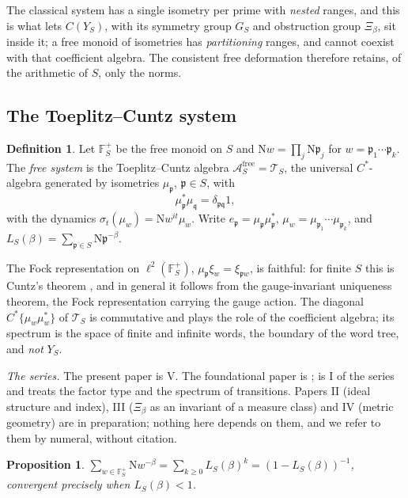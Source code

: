 \documentclass[11pt]{amsart}
\numberwithin{equation}{section}
\newtheorem{proposition}[theorem]{Proposition}
\theoremstyle{definition}
\newtheorem{definition}[theorem]{Definition}
\theoremstyle{remark}
\newcommand{\F}{\mathbb{F}}
\newcommand{\cA}{\mathcal{A}}
\newcommand{\cT}{\mathcal{T}}
\newcommand{\pp}{\mathfrak{p}}
\newcommand{\qq}{\mathfrak{q}}
\newcommand{\Ns}{\mathrm{N}}
\begin{document}
The classical system has a single isometry per prime with \emph{nested} ranges, and this
is what lets $C(Y_S)$, with its symmetry group $G_S$ and obstruction group $\Xi_\beta$, sit
inside it; a free monoid of isometries has \emph{partitioning} ranges, and cannot coexist
with that coefficient algebra. The consistent free deformation therefore retains, of the
arithmetic of $S$, only the norms.

\subsection{The Toeplitz--Cuntz system}

\begin{definition}\label{def:free}
Let $\F_S^+$ be the free monoid on $S$ and $\Ns w=\prod_j\Ns\pp_j$ for
$w=\pp_1\cdots\pp_k$. The \emph{free system} is the Toeplitz--Cuntz algebra
$\cA^{\mathrm{free}}_S=\cT_S$, the universal $C^*$-algebra generated by isometries $\mu_\pp$,
$\pp\in S$, with
\begin{equation}\label{eq:rel}
\mu_\pp^*\mu_\qq=\delta_{\pp\qq}1 ,
\end{equation}
with the dynamics $\sigma_t(\mu_w)=\Ns w^{it}\mu_w$. Write $e_\pp=\mu_\pp\mu_\pp^*$,
$\mu_w=\mu_{\pp_1}\cdots\mu_{\pp_k}$, and $L_S(\beta)=\sum_{\pp\in S}\Ns\pp^{-\beta}$.
\end{definition}

The Fock representation on $\ell^2(\F_S^+)$, $\mu_\pp\xi_w=\xi_{\pp w}$, is faithful: for
finite $S$ this is Cuntz's theorem \cite{Cuntz77}, and in general it follows from the
gauge-invariant uniqueness theorem, the Fock representation carrying the gauge action. The diagonal $C^*\{\mu_w\mu_w^*\}$ of $\cT_S$ is commutative and plays the
role of the coefficient algebra; its spectrum is the space of finite and infinite words,
the boundary of the word tree, and \emph{not} $Y_S$.

\emph{The series.} The present paper is V. The foundational paper is \cite{Main};
\cite{SeriesI} is I of the series and treats the factor type and the spectrum of
transitions. Papers II (ideal structure and index), III ($\Xi_\beta$ as an invariant of a
measure class) and IV (metric geometry) are in preparation; nothing here depends on them,
and we refer to them by numeral, without citation.

\begin{proposition}\label{prop:Z}
$\sum_{w\in\F_S^+}\Ns w^{-\beta}=\sum_{k\ge0}L_S(\beta)^k=(1-L_S(\beta))^{-1}$, convergent
precisely when $L_S(\beta)<1$.
\end{proposition}
\end{document}
